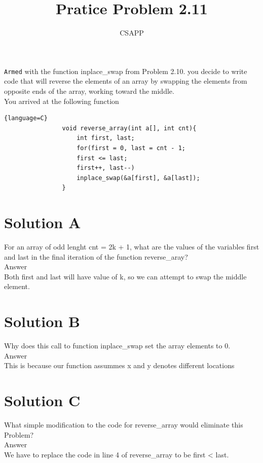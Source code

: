 \documentclass{article}
\title{Pratice Problem 2.11}
\author{CSAPP}
\begin{document}
    \maketitle

        \begin{flushleft}
        \texttt{Armed} with the function inplace\_swap from
        Problem 2.10. you decide to write code that will reverse the elements
        of an array by swapping the elements from opposite ends of the array,
        working toward the middle.\\
        You arrived at the following function
            \smallskip
            \begin{lstlisting}{language=C}
                void reverse_array(int a[], int cnt){
                    int first, last;
                    for(first = 0, last = cnt - 1;
                    first <= last; 
                    first++, last--)
                    inplace_swap(&a[first], &a[last]);
                }
            \end{lstlisting}

            \section*{\small Solution A}
            For an array of odd lenght cnt = 2k + 1, what are the values of 
            the variables first and last in the final iteration of the function
            reverse\_aray?\\
            Answer\\
            Both first and last will have value of k, so we can attempt
            to swap the middle element.

            \section*{\small Solution B}
            Why does this call to function inplace\_swap set the array
            elements to 0.\\
            Answer\\
            This is because our function assummes x and y denotes different locations

            \section*{\small Solution C}
            What simple modification to the code for reverse\_array would 
            eliminate this Problem?\\
            Answer\\
            We have to replace the code in line 4 of reverse\_array to be 
            first < last. 
        \end{flushleft}
\end{document}
